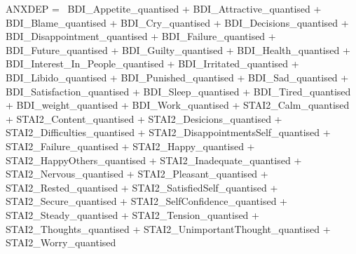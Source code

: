 \documentclass[]{article}
\newenvironment{Shaded}{\begin{snugshade}}{\end{snugshade}}
\newcommand{\StringTok}[1]{\textcolor[rgb]{0.31,0.60,0.02}{#1}}
\begin{document}
\begin{Shaded}
\begin{Highlighting}[]
\StringTok{ANXDEP =~ BDI_Appetite_quantised    + }
\StringTok{       BDI_Attractive_quantised + }
\StringTok{       BDI_Blame_quantised  + }
\StringTok{       BDI_Cry_quantised    +   }
\StringTok{       BDI_Decisions_quantised  +   }
\StringTok{       BDI_Disappointment_quantised +   }
\StringTok{       BDI_Failure_quantised    +   }
\StringTok{       BDI_Future_quantised +   }
\StringTok{       BDI_Guilty_quantised +   }
\StringTok{       BDI_Health_quantised +   }
\StringTok{       BDI_Interest_In_People_quantised +   }
\StringTok{       BDI_Irritated_quantised  +   }
\StringTok{       BDI_Libido_quantised +   }
\StringTok{       BDI_Punished_quantised   +   }
\StringTok{       BDI_Sad_quantised + }
\StringTok{       BDI_Satisfaction_quantised   +   }
\StringTok{       BDI_Sleep_quantised  +   }
\StringTok{       BDI_Tired_quantised  +   }
\StringTok{       BDI_weight_quantised +   }
\StringTok{       BDI_Work_quantised   +}
\StringTok{        STAI2_Calm_quantised +}
\StringTok{        STAI2_Content_quantised +}
\StringTok{        STAI2_Desicions_quantised +}
\StringTok{        STAI2_Difficulties_quantised +}
\StringTok{        STAI2_DisappointmentsSelf_quantised +}
\StringTok{        STAI2_Failure_quantised +}
\StringTok{        STAI2_Happy_quantised +}
\StringTok{        STAI2_HappyOthers_quantised +}
\StringTok{        STAI2_Inadequate_quantised +}
\StringTok{        STAI2_Nervous_quantised +}
\StringTok{        STAI2_Pleasant_quantised +}
\StringTok{        STAI2_Rested_quantised +}
\StringTok{        STAI2_SatisfiedSelf_quantised +}
\StringTok{        STAI2_Secure_quantised +}
\StringTok{        STAI2_SelfConfidence_quantised +}
\StringTok{        STAI2_Steady_quantised +}
\StringTok{        STAI2_Tension_quantised +}
\StringTok{        STAI2_Thoughts_quantised +}
\StringTok{        STAI2_UnimportantThought_quantised +}
\StringTok{        STAI2_Worry_quantised}


\end{Highlighting}
\end{Shaded}
\end{document}
